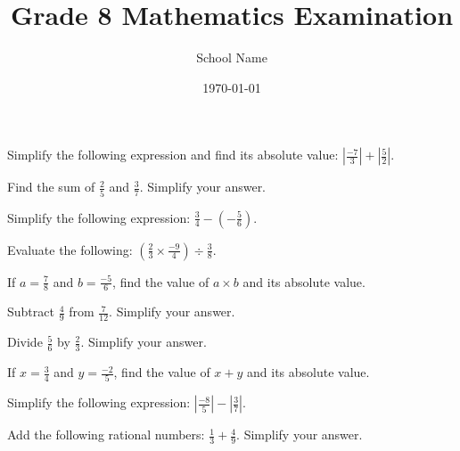 \documentclass[12pt, addpoints]{exam}
\title{Grade 8 Mathematics Examination}
\author{School Name}
\date{\today}
\begin{document}
\maketitle

\begin{questions}

\question[3] Simplify the following expression and find its absolute value: \( \left| \frac{-7}{3} \right| + \left| \frac{5}{2} \right| \).
\vspace{2cm}

\question[3] Find the sum of \( \frac{2}{5} \) and \( \frac{3}{7} \). Simplify your answer.
\vspace{2cm}

\question[3] Simplify the following expression: \( \frac{3}{4} - \left( -\frac{5}{6} \right) \).
\vspace{2cm}

\question[3] Evaluate the following: \( \left( \frac{2}{3} \times \frac{-9}{4} \right) \div \frac{3}{8} \).
\vspace{2cm}

\question[3] If \( a = \frac{7}{8} \) and \( b = \frac{-5}{6} \), find the value of \( a \times b \) and its absolute value.
\vspace{2cm}

\question[3] Subtract \( \frac{4}{9} \) from \( \frac{7}{12} \). Simplify your answer.
\vspace{2cm}

\question[3] Divide \( \frac{5}{6} \) by \( \frac{2}{3} \). Simplify your answer.
\vspace{2cm}

\question[3] If \( x = \frac{3}{4} \) and \( y = \frac{-2}{5} \), find the value of \( x + y \) and its absolute value.
\vspace{2cm}

\question[3] Simplify the following expression: \( \left| \frac{-8}{5} \right| - \left| \frac{3}{7} \right| \).
\vspace{2cm}

\question[3] Add the following rational numbers: \( \frac{1}{3} + \frac{4}{9} \). Simplify your answer.
\vspace{2cm}

\end{questions}
\end{document}
